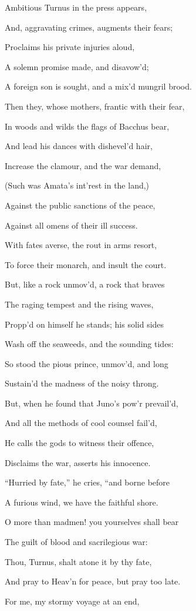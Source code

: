 Ambitious Turnus in the press appears,

And, aggravating crimes, augments their fears;

Proclaims his private injuries aloud,

A solemn promise made, and disavow’d;

A foreign son is sought, and a mix’d mungril brood.

Then they, whose mothers, frantic with their fear,

In woods and wilds the flags of Bacchus bear,

And lead his dances with dishevel’d hair,

Increase the clamour, and the war demand,

(Such was Amata’s int’rest in the land,)

Against the public sanctions of the peace,

Against all omens of their ill success.

With fates averse, the rout in arms resort,

To force their monarch, and insult the court.

But, like a rock unmov’d, a rock that braves

The raging tempest and the rising waves,

Propp’d on himself he stands; his solid sides

Wash off the seaweeds, and the sounding tides:

So stood the pious prince, unmov’d, and long

Sustain’d the madness of the noisy throng.

But, when he found that Juno’s pow’r prevail’d,

And all the methods of cool counsel fail’d,

He calls the gods to witness their offence,

Disclaims the war, asserts his innocence.

“Hurried by fate,” he cries, “and borne before

A furious wind, we have the faithful shore.

O more than madmen! you yourselves shall bear

The guilt of blood and sacrilegious war:

Thou, Turnus, shalt atone it by thy fate,

And pray to Heav’n for peace, but pray too late.

For me, my stormy voyage at an end,

